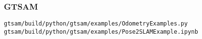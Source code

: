 \begin{frame}[fragile]
    \frametitle{GTSAM}

\begin{lstlisting}[style=bash] 
gtsam/build/python/gtsam/examples/OdometryExamples.py
gtsam/build/python/gtsam/examples/Pose2SLAMExample.ipynb
\end{lstlisting}
    
\end{frame}